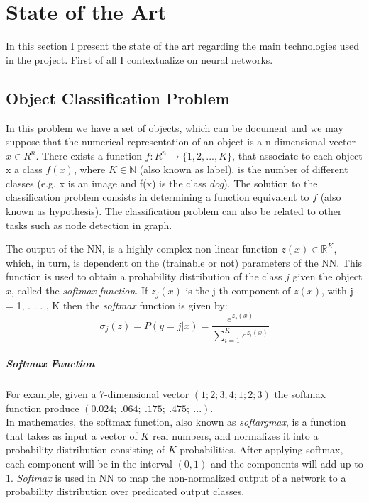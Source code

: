 \documentclass{report}
\begin{document}
\section{State of the Art}
In this section I present the state of the art regarding the main technologies used in the project.
First of all I contextualize on neural networks.
\subsection{Object Classification Problem}
In this problem we have a set of objects, which can be document and we may suppose that the numerical representation of an object is a n-dimensional vector $x \in R^n$. There exists a function $f : R^n \rightarrow \{1, 2, . . . , K\}$, that associate to each object x a class $f(x)$, where $K \in \mathbb{N}$ (also known as label), is the number of different classes (e.g. x is an image and f(x)
is the class \textit{dog}). The solution to the classification problem consists in
determining a function equivalent to $f$ (also known as hypothesis).
The classification problem can also be related to other tasks such as node detection in graph.

The output of the NN, is a highly complex non-linear function $z(x) \in \mathbb{R}^K$,
which, in turn, is dependent on the (trainable or not) parameters of the NN. This function is used to obtain a probability distribution of the class $j$ given the object $x$, called the
\textit{softmax function}. If $z_j(x)$ is the j-th component of $z(x)$, with  j = 1, . . . , K then the \textit{softmax} function is given by:
\begin{equation}
\sigma_j(z) = P(y=j | x) = \dfrac{e^{z_j(x)}}{\sum_{i=1}^{K} e^{z_i(x)}}
\end{equation}

\subparagraph{Softmax Function}For example, given a 7-dimensional vector $(1;2;3;4;1;2;3)$ the softmax function produce $(0.024;\ .064;\ .175;\ .475;\ ...)$.\\
In mathematics, the softmax function, also known as \textit{softargmax}, is a function that takes as input a vector of $K$ real numbers, and normalizes it into a probability distribution consisting of $K$ probabilities. After applying softmax, each component will be in the interval $(0,1)$ and the components will add up to $1$. \textit{Softmax} is used in NN to map the non-normalized output of a network to a probability distribution over predicated output classes.
\end{document}
